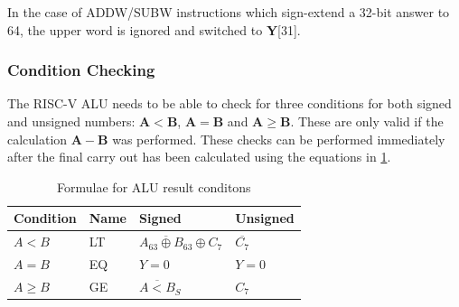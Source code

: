 \documentclass[a4paper, 11pt]{article}
\begin{document}
                In the case of ADDW/SUBW instructions which sign-extend a 32-bit answer
                to 64, the upper word is ignored and switched to \textbf{Y}[31].

            \subsubsection{Condition Checking}\label{sec:ALU:Adder:Conds}

                The RISC-V ALU needs to be able to check for three conditions for both
                signed and unsigned numbers: \(\mathbf{A < B}\), \(\mathbf{A = B}\)
                and \(\mathbf{A \ge B}\). These are only valid if the calculation
                \(\mathbf{A-B}\) was performed.
                These checks can be performed immediately after the final carry
                out has been calculated using the equations in
                \cref{tab:ALU:Adder:Conds:ALUConds}.

                \begin{table}[htb]
                    \centering
                    \renewcommand{\arraystretch}{1.2}
                    \caption{Formulae for ALU result conditons}
                    \label{tab:ALU:Adder:Conds:ALUConds}
                    \begin{tabularx}{\textwidth}{
                        >{\hsize=0.2\hsize\raggedright\arraybackslash}X
                        >{\hsize=0.1\hsize\raggedright\arraybackslash}X
                        >{\hsize=0.35\hsize\raggedright\arraybackslash}X
                        >{\hsize=0.35\hsize\raggedright\arraybackslash}X 
                        }
                        \addlinespace

                        \toprule
                        Condition   &Name   &Signed     &Unsigned   \\
                        \midrule \addlinespace

                        \(A < B\)   &LT &\(\overline{A_{63} \oplus B_{63}} \oplus C_{7}\)   &\(\overline{C_{7}}\)   \\
                        \(A = B\)   &EQ &\(Y = 0\)  &\(Y = 0\)  \\
                        \(A \ge B\) &GE &\(\overline{A < B}_S\) &\(C_7\)\\
                        \bottomrule
                    \end{tabularx}
                \end{table}
\end{document}
